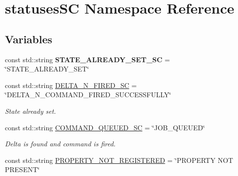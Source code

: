 \hypertarget{namespacestatusesSC}{}\section{statuses\+SC Namespace Reference}
\label{namespacestatusesSC}
\subsection*{Variables}
\begin{DoxyCompactItemize}
\item 
const std\+::string {\bfseries S\+T\+A\+T\+E\+\_\+\+A\+L\+R\+E\+A\+D\+Y\+\_\+\+S\+E\+T\+\_\+\+SC} = \char`\"{}S\+T\+A\+T\+E\+\_\+\+A\+L\+R\+E\+A\+D\+Y\+\_\+\+S\+ET\char`\"{}\hypertarget{namespacestatusesSC_a24be024b0d9e2310eab250ad15353cc5}{}\label{namespacestatusesSC_a24be024b0d9e2310eab250ad15353cc5}

\item 
const std\+::string \hyperlink{namespacestatusesSC_a508da10e5280dede7983a979b5d047d9}{D\+E\+L\+T\+A\+\_\+\+N\+\_\+\+F\+I\+R\+E\+D\+\_\+\+SC} = \char`\"{}D\+E\+L\+T\+A\+\_\+\+N\+\_\+\+C\+O\+M\+M\+A\+N\+D\+\_\+\+F\+I\+R\+E\+D\+\_\+\+S\+U\+C\+C\+E\+S\+S\+F\+U\+L\+LY\char`\"{}\hypertarget{namespacestatusesSC_a508da10e5280dede7983a979b5d047d9}{}\label{namespacestatusesSC_a508da10e5280dede7983a979b5d047d9}

\begin{DoxyCompactList}\small\item\em State already set. \end{DoxyCompactList}\item 
const std\+::string \hyperlink{namespacestatusesSC_a05f8f5b071fab81dc959685f80dae216}{C\+O\+M\+M\+A\+N\+D\+\_\+\+Q\+U\+E\+U\+E\+D\+\_\+\+SC} = \char`\"{}J\+O\+B\+\_\+\+Q\+U\+E\+U\+ED\char`\"{}\hypertarget{namespacestatusesSC_a05f8f5b071fab81dc959685f80dae216}{}\label{namespacestatusesSC_a05f8f5b071fab81dc959685f80dae216}

\begin{DoxyCompactList}\small\item\em Delta is found and command is fired. \end{DoxyCompactList}\item 
const std\+::string \hyperlink{namespacestatusesSC_a5e1bd8debf26be29a2e22f5ca8331ebc}{P\+R\+O\+P\+E\+R\+T\+Y\+\_\+\+N\+O\+T\+\_\+\+R\+E\+G\+I\+S\+T\+E\+R\+ED} = \char`\"{}P\+R\+O\+P\+E\+R\+TY N\+OT P\+R\+E\+S\+E\+NT\char`\"{}\hypertarget{namespacestatusesSC_a5e1bd8debf26be29a2e22f5ca8331ebc}{}\label{namespacestatusesSC_a5e1bd8debf26be29a2e22f5ca8331ebc}


\end{DoxyCompactItemize}
